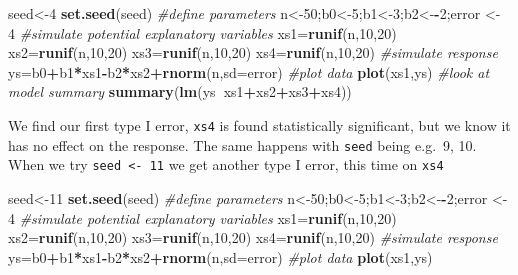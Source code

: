 \documentclass[
]{book}
\newenvironment{Shaded}{\begin{snugshade}}{\end{snugshade}}
\newcommand{\CommentTok}[1]{\textcolor[rgb]{0.56,0.35,0.01}{\textit{#1}}}
\newcommand{\DataTypeTok}[1]{\textcolor[rgb]{0.13,0.29,0.53}{#1}}
\newcommand{\DecValTok}[1]{\textcolor[rgb]{0.00,0.00,0.81}{#1}}
\newcommand{\KeywordTok}[1]{\textcolor[rgb]{0.13,0.29,0.53}{\textbf{#1}}}
\newcommand{\NormalTok}[1]{#1}
\newcommand{\OperatorTok}[1]{\textcolor[rgb]{0.81,0.36,0.00}{\textbf{#1}}}
\newcommand{\StringTok}[1]{\textcolor[rgb]{0.31,0.60,0.02}{#1}}
\begin{document}
\begin{Shaded}
\begin{Highlighting}[]
\NormalTok{seed<-}\DecValTok{4}
\KeywordTok{set.seed}\NormalTok{(seed)}
\CommentTok{#define parameters}
\NormalTok{n<-}\DecValTok{50}\NormalTok{;b0<-}\DecValTok{5}\NormalTok{;b1<-}\DecValTok{3}\NormalTok{;b2<-}\OperatorTok{-}\DecValTok{2}\NormalTok{;error <-}\StringTok{ }\DecValTok{4}
\CommentTok{#simulate potential explanatory variables}
\NormalTok{xs1=}\KeywordTok{runif}\NormalTok{(n,}\DecValTok{10}\NormalTok{,}\DecValTok{20}\NormalTok{)}
\NormalTok{xs2=}\KeywordTok{runif}\NormalTok{(n,}\DecValTok{10}\NormalTok{,}\DecValTok{20}\NormalTok{)}
\NormalTok{xs3=}\KeywordTok{runif}\NormalTok{(n,}\DecValTok{10}\NormalTok{,}\DecValTok{20}\NormalTok{)}
\NormalTok{xs4=}\KeywordTok{runif}\NormalTok{(n,}\DecValTok{10}\NormalTok{,}\DecValTok{20}\NormalTok{)}
\CommentTok{#simulate response}
\NormalTok{ys=b0}\OperatorTok{+}\NormalTok{b1}\OperatorTok{*}\NormalTok{xs1}\OperatorTok{-}\NormalTok{b2}\OperatorTok{*}\NormalTok{xs2}\OperatorTok{+}\KeywordTok{rnorm}\NormalTok{(n,}\DataTypeTok{sd=}\NormalTok{error)}
\CommentTok{#plot data}
\KeywordTok{plot}\NormalTok{(xs1,ys)}
\CommentTok{#look at model summary}
\KeywordTok{summary}\NormalTok{(}\KeywordTok{lm}\NormalTok{(ys}\OperatorTok{~}\NormalTok{xs1}\OperatorTok{+}\NormalTok{xs2}\OperatorTok{+}\NormalTok{xs3}\OperatorTok{+}\NormalTok{xs4))}
\end{Highlighting}
\end{Shaded}

We find our first type I error, \texttt{xs4} is found statistically significant, but we know it has no effect on the response. The same happens with \texttt{seed} being e.g.~9, 10. When we try \texttt{seed\ \textless{}-\ 11} we get another type I error, this time on \texttt{xs4}

\begin{Shaded}
\begin{Highlighting}[]
\NormalTok{seed<-}\DecValTok{11}
\KeywordTok{set.seed}\NormalTok{(seed)}
\CommentTok{#define parameters}
\NormalTok{n<-}\DecValTok{50}\NormalTok{;b0<-}\DecValTok{5}\NormalTok{;b1<-}\DecValTok{3}\NormalTok{;b2<-}\OperatorTok{-}\DecValTok{2}\NormalTok{;error <-}\StringTok{ }\DecValTok{4}
\CommentTok{#simulate potential explanatory variables}
\NormalTok{xs1=}\KeywordTok{runif}\NormalTok{(n,}\DecValTok{10}\NormalTok{,}\DecValTok{20}\NormalTok{)}
\NormalTok{xs2=}\KeywordTok{runif}\NormalTok{(n,}\DecValTok{10}\NormalTok{,}\DecValTok{20}\NormalTok{)}
\NormalTok{xs3=}\KeywordTok{runif}\NormalTok{(n,}\DecValTok{10}\NormalTok{,}\DecValTok{20}\NormalTok{)}
\NormalTok{xs4=}\KeywordTok{runif}\NormalTok{(n,}\DecValTok{10}\NormalTok{,}\DecValTok{20}\NormalTok{)}
\CommentTok{#simulate response}
\NormalTok{ys=b0}\OperatorTok{+}\NormalTok{b1}\OperatorTok{*}\NormalTok{xs1}\OperatorTok{-}\NormalTok{b2}\OperatorTok{*}\NormalTok{xs2}\OperatorTok{+}\KeywordTok{rnorm}\NormalTok{(n,}\DataTypeTok{sd=}\NormalTok{error)}
\CommentTok{#plot data}
\KeywordTok{plot}\NormalTok{(xs1,ys)}
\end{Highlighting}
\end{Shaded}
\end{document}
